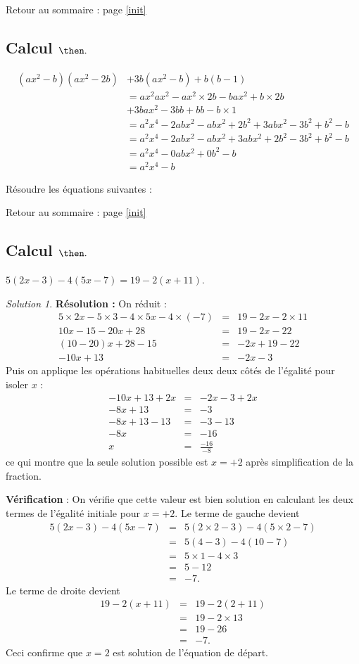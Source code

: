 \documentclass[14pt]{article}
\theoremstyle{remark}
\newtheorem*{sol}{Solution}
\newcounter{n}
\renewcommand{\it}{Retour au sommaire : page \ref{init}
	\subsection{Calcul $ \mathbf{ \then}.$}\label{\then} \stepcounter{n} }
\theoremstyle{plain}
\begin{document}
\it \begin{align*}(ax^2-b)(ax^2-2b)&+3b(ax^2-b)+b(b-1)
\\
&= ax^2ax^2-ax^2\times2b-bax^2+b\times2b \\&+ 3bax^2-3bb+bb-b\times1\\
&= a^2x^4-2abx^2-abx^2+2b^2+3abx^2-3b^2+b^2-b\\
&= a^2x^4-2abx^2-abx^2+3abx^2 +2b^2-3b^2+b^2-b\\
&= a^2x^4-0abx^2+0b^2-b\\
&=a^2x^4-b\end{align*}


Résoudre les équations suivantes : 

\it $5(2x-3) - 4(5x-7)=19-2(x+11)$. 
\begin{sol}
\textbf{Résolution :}
On réduit : 
\begin{eqnarray*}
5\times2x-5\times3-4\times5x-4\times(-7) &=& 19 -2x-2\times11\\
10x-15-20x+28 &=& 19-2x-22\\
(10-20)x+28-15 &=& -2x+19-22\\
-10x+13 &=& -2x-3\end{eqnarray*}
Puis on applique les opérations habituelles deux deux côtés de l'égalité pour isoler $x$ : 
\begin{eqnarray*}
-10x+13+2x&=& -2x-3+2x\\
-8x+13&=& -3\\
-8x+13-13 &=& -3-13\\
-8x &=& -16\\
x &=& \frac{-16}{-8}
\end{eqnarray*}
ce qui montre que la seule solution possible est $x=+2$ après simplification de la fraction. 

\textbf{Vérification} : On vérifie que cette valeur est bien solution en calculant les deux termes de l'égalité initiale pour $x=+2$.
Le terme de gauche devient 
\begin{eqnarray*}
5(2x-3)-4(5x-7) &=& 5\left(2\times2-3\right) -4\left(5\times2-7\right)\\
&=& 5(4-3) - 4\left(10-7\right)\\
&=& 5\times 1- 4 \times 3\\
&=& 5-12 \\
&=& -7.\end{eqnarray*}
Le terme de droite devient 
\begin{eqnarray*}
19-2(x+11) &=& 19-2\left(2+11\right)\\
&=& 19- 2 \times13\\
&=& 19-26\\
&=& -7.\end{eqnarray*}
Ceci confirme que $x=2$ est solution de l'équation de départ.
\end{sol}
\end{document}
